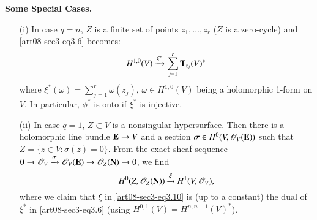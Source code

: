 \medskip
\noindent
{\bf Some Special Cases.}
\begin{itemize}
\item[(i)] In case $q=n$, $Z$ is a finite set of points $z_{1},\ldots,z_{r}$ ($Z$ is a zero-cycle) and \eqref{art08-sec3-eq3.6} becomes:
\begin{equation}
H^{1,0}(V)\xrightarrow{\xi^{*}}\sum\limits^{r}_{j=1}\mathbf{T}_{z_{j}}(V)^{*}\label{art08-sec3-eq3.9}
\end{equation}
where $\xi^{*}(\omega)=\sum\limits^{r}_{j=1}\omega(z_{j})$, $\omega\in H^{1,0}(V)$ being a holomorphic 1-form on $V$. In particular, $\phi^{*}$ is onto if $\xi^{*}$ is injective.

\item[(ii)] In case $q=1$, $Z\subset V$ is a nonsingular hypersurface. Then there is a holomorphic line bundle $\mathbf{E}\to V$ and a section $\sigma\in H^{0}(V,\mathscr{O}_{V}(\mathbf{E}))$ such that $Z=\{z\in V:\sigma(z)=0\}$. From the exact sheaf sequence $0\to \mathscr{O}_{V}\xrightarrow{\sigma}\mathscr{O}_{V}(\mathbf{E})\to \mathscr{O}_{Z}(\mathbf{N})\to 0$, we find
\begin{equation}
H^{0}(Z,\mathscr{O}_{Z}(\mathbf{N}))\xrightarrow{\xi}H^{1}(V,\mathscr{O}_{V}),\label{art08-sec3-eq3.10}
\end{equation}
where we claim that $\xi$ in \eqref{art08-sec3-eq3.10} is (up to a constant) the dual of $\xi^{*}$ in \eqref{art08-sec3-eq3.6} (using $H^{0,1}(V)=H^{n,n-1}(V)^{*}$).
\end{itemize}


